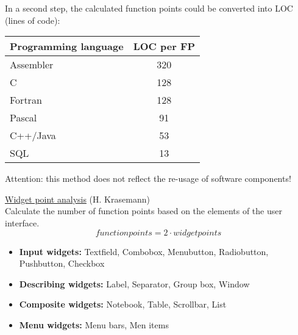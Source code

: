 In a second step, the calculated function points could be converted into
LOC (lines of code):
\begin{center}
\begin{tabular}{|l|c|}
\hline
Programming language & LOC per FP \\
\hline
Assembler & 320 \\
C         & 128 \\
Fortran   & 128 \\
Pascal    & 91 \\
C++/Java  & 53 \\
SQL       & 13 \\
\hline
\end{tabular}
\end{center}
Attention: this method does not reflect the re-usage of software
components!

\vspace{5mm}

\newslide
\underline{Widget point analysis} (H. Krasemann)\\[2ex]
Calculate the number of function points based on the elements of the
user interface.
\begin{equation}
 function points = 2\cdot widget points
\end{equation}
\begin{itemize}
\item {\bfseries Input widgets:} Textfield, Combobox, Menubutton, Radiobutton, Pushbutton,
  Checkbox
\item {\bfseries Describing widgets:} Label, Separator, Group box, Window
\item {\bfseries Composite widgets:} Notebook, Table, Scrollbar, List
\item {\bfseries Menu widgets:} Menu bars, Men items
\end{itemize}

